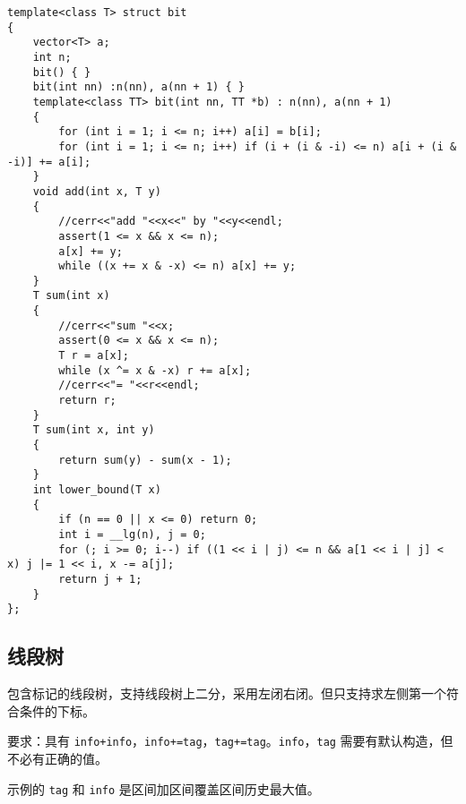 \documentclass[12pt]{ctexart}
\begin{document}
\begin{lstlisting}
template<class T> struct bit
{
	vector<T> a;
	int n;
	bit() { }
	bit(int nn) :n(nn), a(nn + 1) { }
	template<class TT> bit(int nn, TT *b) : n(nn), a(nn + 1)
	{
		for (int i = 1; i <= n; i++) a[i] = b[i];
		for (int i = 1; i <= n; i++) if (i + (i & -i) <= n) a[i + (i & -i)] += a[i];
	}
	void add(int x, T y)
	{
		//cerr<<"add "<<x<<" by "<<y<<endl;
		assert(1 <= x && x <= n);
		a[x] += y;
		while ((x += x & -x) <= n) a[x] += y;
	}
	T sum(int x)
	{
		//cerr<<"sum "<<x;
		assert(0 <= x && x <= n);
		T r = a[x];
		while (x ^= x & -x) r += a[x];
		//cerr<<"= "<<r<<endl;
		return r;
	}
	T sum(int x, int y)
	{
		return sum(y) - sum(x - 1);
	}
	int lower_bound(T x)
	{
		if (n == 0 || x <= 0) return 0;
		int i = __lg(n), j = 0;
		for (; i >= 0; i--) if ((1 << i | j) <= n && a[1 << i | j] < x) j |= 1 << i, x -= a[j];
		return j + 1;
	}
};
\end{lstlisting}

\subsection{线段树}

包含标记的线段树，支持线段树上二分，采用左闭右闭。但只支持求左侧第一个符合条件的下标。

要求：具有 \verb|info+info|，\verb|info+=tag|，\verb|tag+=tag|。\verb|info|，\verb|tag| 需要有默认构造，但不必有正确的值。

示例的 \verb|tag| 和 \verb|info| 是区间加区间覆盖区间历史最大值。
\end{document}
